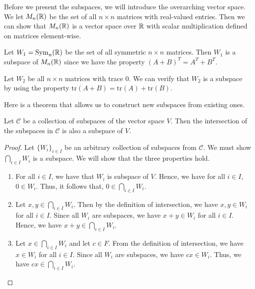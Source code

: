 \documentclass[main.tex]{subfiles}
\begin{document}
    Before we present the subspaces, we will introduce the overarching vector space. We let $M_n(\mathbb{R})$ be the set of all $n\times n$ matrices with real-valued entries. Then we can show that $M_n(\mathbb{R})$ is a vector space over $\mathbb{R}$ with scalar multiplication defined on matrices element-wise. 

    \begin{example}{}{}
        Let $W_1 = \mathrm{Sym}_n(\mathbb{R})$ be the set of all symmetric $n\times n$ matrices. Then $W_1$ is a subspace of $M_n(\mathbb{R})$ since we have the property $(A+B)^T = A^T + B^T$. \bigbreak 

        Let $W_2$ be all $n\times n$ matrices with trace 0. We can verify that $W_2$ is a subspace by using the property $\mathrm{tr}(A + B) = \mathrm{tr}(A) + \mathrm{tr}(B)$.
    \end{example}

    Here is a theorem that allows us to construct new subspaces from existing ones. 
    \begin{thrm}{}{}
        Let $\mathcal{C}$ be a collection of subspaces of the vector space $V$. Then the intersection of the subspaces in $\mathcal{C}$ is also a subspace of $V$.
    \end{thrm}
    \begin{proof}
        Let $\{W_i\}_{i\in I}$ be an arbitrary collection of subspaces from $\mathcal{C}$. We must show $\bigcap_{i\in I}W_i$ is a subspace. We will show that the three properties hold. 

        \begin{enumerate}
            \item For all $i\in I$, we have that $W_i$ is subspace of $V$. Hence, we have for all $i\in I$, $0\in W_i$. Thus, it follows that, $0\in \bigcap_{i\in I}W_i$. 

            \item Let $x,y\in \bigcap_{i\in I} W_i$. Then by the definition of intersection, we have $x, y\in W_i$ for all $i\in I$. Since all $W_i$ are subspaces, we have $x+y\in W_i$ for all $i\in I$. Hence, we have $x+y\in \bigcap_{i\in I} W_i$.

            \item Let $x\in \bigcap_{i\in I} W_i$ and let $c\in F$. From the definition of intersection, we have $x\in W_i$ for all $i\in I$. Since all $W_i$ are subspaces, we have $cx\in W_i$. Thus, we have $cx\in \bigcap_{i\in I}W_i$.
        \end{enumerate}
    \end{proof}
\end{document}
